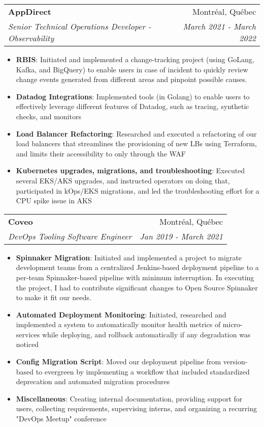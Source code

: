 \documentclass[letterpaper,11pt]{article}
\makeatletter
\newcommand{\resumeItem}[2]{
  \item\small{
    \textbf{#1}{: #2 \vspace{-2pt}}
  }
}
\newcommand{\resumeSubheading}[4]{
  \vspace{-1pt}\item
    \begin{tabular*}{0.97\textwidth}[t]{l@{\extracolsep{\fill}}r}
      \textbf{#1} & #2 \\
      \textit{\small#3} & \textit{\small #4} \\
    \end{tabular*}\vspace{-5pt}
}
\newcommand{\resumeSubSubheading}[2]{
    \begin{tabular*}{0.97\textwidth}{l@{\extracolsep{\fill}}r}
      \textit{\small#1} & \textit{\small #2} \\
    \end{tabular*}\vspace{-5pt}
}
\newcommand{\resumeSubHeadingListEnd}{\end{itemize}}
\newcommand{\resumeItemListStart}{\begin{itemize}}
\newcommand{\resumeItemListEnd}{\end{itemize}\vspace{-5pt}}
\makeatother
\begin{document}
    \resumeSubheading
      {AppDirect}{Montréal, Québec}
      {Senior Technical Operations Developer - Observability}{March 2021 - March 2022}
      \resumeItemListStart
        \resumeItem{RBIS}
          {Initiated and implemented a change-tracking project (using GoLang, Kafka, and BigQuery) to enable users in case of incident to quickly review change events generated from different areas and pinpoint possible causes.  }
        \resumeItem{Datadog Integrations}
          {Implemented tools (in Golang) to enable users to effectively leverage different features of Datadog, such as tracing, synthetic checks, and monitors}
        \resumeItem{Load Balancer Refactoring}
          {Researched and executed a refactoring of our load balancers that streamlines the provisioning of new LBs using Terraform, and limits their accessibility to only through the WAF}
        \resumeItem{Kubernetes upgrades, migrations, and troubleshooting} 
          {Executed several EKS/AKS upgrades, and instructed operators on doing that, participated in kOps/EKS migrations, and led the troubleshooting effort for a CPU spike issue in AKS }
      \resumeItemListEnd

    \resumeSubheading
      {Coveo}{Montréal, Québec}
      {DevOps Tooling Software Engineer}{Jan 2019 - March 2021}
      \resumeItemListStart
        \resumeItem{Spinnaker Migration}
          {Initiated and implemented a project to migrate development teams from a centralized Jenkins-based deployment pipeline to a per-team Spinnaker-based pipeline with minimum interruption. In executing the project, I had to contribute significant changes to Open Source Spinnaker to make it fit our needs. }
        \resumeItem{Automated Deployment Monitoring}
          {Initiated, researched and implemented a system to automatically monitor health metrics of micro-services while deploying, and rollback automatically if any degradation was noticed}
        \resumeItem{Config Migration Script}
          {Moved our deployment pipeline from version-based to evergreen by implementing a workflow that included standardized deprecation and automated migration procedures}
        \resumeItem{Miscellaneous} 
          {Creating internal documentation, providing support for users, collecting requirements, supervising interns, and organizing a recurring "DevOps Meetup" conference}
      \resumeItemListEnd
      
\end{document}
